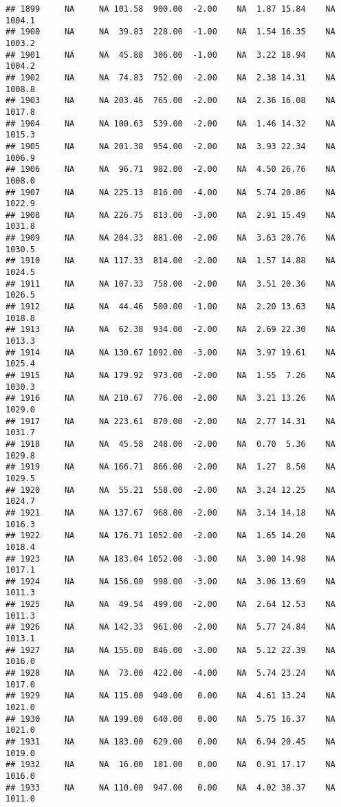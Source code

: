 \documentclass{article}\usepackage{graphicx, color}
\makeatletter
\newenvironment{kframe}{%
 \def\at@end@of@kframe{}%
 \ifinner\ifhmode%
  \def\at@end@of@kframe{\end{minipage}}%
  \begin{minipage}{\columnwidth}%
 \fi\fi%
 \def\FrameCommand##1{\hskip\@totalleftmargin \hskip-\fboxsep
 \colorbox{shadecolor}{##1}\hskip-\fboxsep
     \hskip-\linewidth \hskip-\@totalleftmargin \hskip\columnwidth}%
 \MakeFramed {\advance\hsize-\width
   \@totalleftmargin\z@ \linewidth\hsize
   \@setminipage}}%
 {\par\unskip\endMakeFramed%
 \at@end@of@kframe}
\newenvironment{knitrout}{}{} %
\makeatother
\begin{document}
\begin{knitrout}
\begin{kframe}
\begin{verbatim}
## 1899     NA     NA 101.58  900.00  -2.00    NA  1.87 15.84    NA 1004.1
## 1900     NA     NA  39.83  228.00  -1.00    NA  1.54 16.35    NA 1003.2
## 1901     NA     NA  45.88  306.00  -1.00    NA  3.22 18.94    NA 1004.2
## 1902     NA     NA  74.83  752.00  -2.00    NA  2.38 14.31    NA 1008.8
## 1903     NA     NA 203.46  765.00  -2.00    NA  2.36 16.08    NA 1017.8
## 1904     NA     NA 100.63  539.00  -2.00    NA  1.46 14.32    NA 1015.3
## 1905     NA     NA 201.38  954.00  -2.00    NA  3.93 22.34    NA 1006.9
## 1906     NA     NA  96.71  982.00  -2.00    NA  4.50 26.76    NA 1008.0
## 1907     NA     NA 225.13  816.00  -4.00    NA  5.74 20.86    NA 1022.9
## 1908     NA     NA 226.75  813.00  -3.00    NA  2.91 15.49    NA 1031.8
## 1909     NA     NA 204.33  881.00  -2.00    NA  3.63 20.76    NA 1030.5
## 1910     NA     NA 117.33  814.00  -2.00    NA  1.57 14.88    NA 1024.5
## 1911     NA     NA 107.33  758.00  -2.00    NA  3.51 20.36    NA 1026.5
## 1912     NA     NA  44.46  500.00  -1.00    NA  2.20 13.63    NA 1018.8
## 1913     NA     NA  62.38  934.00  -2.00    NA  2.69 22.30    NA 1013.3
## 1914     NA     NA 130.67 1092.00  -3.00    NA  3.97 19.61    NA 1025.4
## 1915     NA     NA 179.92  973.00  -2.00    NA  1.55  7.26    NA 1030.3
## 1916     NA     NA 210.67  776.00  -2.00    NA  3.21 13.26    NA 1029.0
## 1917     NA     NA 223.61  870.00  -2.00    NA  2.77 14.31    NA 1031.7
## 1918     NA     NA  45.58  248.00  -2.00    NA  0.70  5.36    NA 1029.8
## 1919     NA     NA 166.71  866.00  -2.00    NA  1.27  8.50    NA 1029.5
## 1920     NA     NA  55.21  558.00  -2.00    NA  3.24 12.25    NA 1024.7
## 1921     NA     NA 137.67  968.00  -2.00    NA  3.14 14.18    NA 1016.3
## 1922     NA     NA 176.71 1052.00  -2.00    NA  1.65 14.20    NA 1018.4
## 1923     NA     NA 183.04 1052.00  -3.00    NA  3.00 14.98    NA 1017.1
## 1924     NA     NA 156.00  998.00  -3.00    NA  3.06 13.69    NA 1011.3
## 1925     NA     NA  49.54  499.00  -2.00    NA  2.64 12.53    NA 1011.3
## 1926     NA     NA 142.33  961.00  -2.00    NA  5.77 24.84    NA 1013.1
## 1927     NA     NA 155.00  846.00  -3.00    NA  5.12 22.39    NA 1016.0
## 1928     NA     NA  73.00  422.00  -4.00    NA  5.74 23.24    NA 1017.0
## 1929     NA     NA 115.00  940.00   0.00    NA  4.61 13.24    NA 1021.0
## 1930     NA     NA 199.00  640.00   0.00    NA  5.75 16.37    NA 1021.0
## 1931     NA     NA 183.00  629.00   0.00    NA  6.94 20.45    NA 1019.0
## 1932     NA     NA  16.00  101.00   0.00    NA  0.91 17.17    NA 1016.0
## 1933     NA     NA 110.00  947.00   0.00    NA  4.02 38.37    NA 1011.0

\end{verbatim}
\end{kframe}
\end{knitrout}
\end{document}
